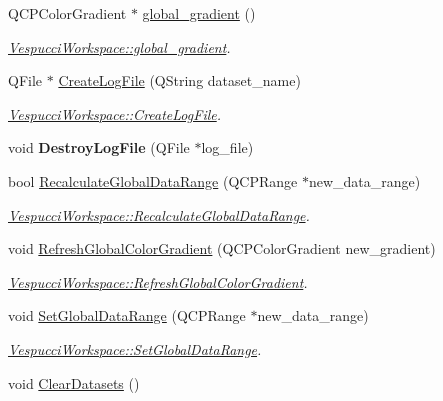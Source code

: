 \begin{DoxyCompactItemize}
Q\+C\+P\+Color\+Gradient $\ast$ \hyperlink{class_vespucci_workspace_a5f48f7a39986081e485eb23df00a5428}{global\+\_\+gradient} ()
\begin{DoxyCompactList}\small\item\em \hyperlink{class_vespucci_workspace_a5f48f7a39986081e485eb23df00a5428}{Vespucci\+Workspace\+::global\+\_\+gradient}. \end{DoxyCompactList}\item 
Q\+File $\ast$ \hyperlink{class_vespucci_workspace_a146009858a8dcd88e46a695ce9d5c965}{Create\+Log\+File} (Q\+String dataset\+\_\+name)
\begin{DoxyCompactList}\small\item\em \hyperlink{class_vespucci_workspace_a146009858a8dcd88e46a695ce9d5c965}{Vespucci\+Workspace\+::\+Create\+Log\+File}. \end{DoxyCompactList}\item 
\hypertarget{class_vespucci_workspace_a9b26bd75e754f0413760b68716033b74}{void {\bfseries Destroy\+Log\+File} (Q\+File $\ast$log\+\_\+file)}\label{class_vespucci_workspace_a9b26bd75e754f0413760b68716033b74}

\item 
bool \hyperlink{class_vespucci_workspace_a0aefd22de491420f2a172448dafc90fc}{Recalculate\+Global\+Data\+Range} (Q\+C\+P\+Range $\ast$new\+\_\+data\+\_\+range)
\begin{DoxyCompactList}\small\item\em \hyperlink{class_vespucci_workspace_a0aefd22de491420f2a172448dafc90fc}{Vespucci\+Workspace\+::\+Recalculate\+Global\+Data\+Range}. \end{DoxyCompactList}\item 
void \hyperlink{class_vespucci_workspace_a616ca3bc6a0eed206870a25e484eaccb}{Refresh\+Global\+Color\+Gradient} (Q\+C\+P\+Color\+Gradient new\+\_\+gradient)
\begin{DoxyCompactList}\small\item\em \hyperlink{class_vespucci_workspace_a616ca3bc6a0eed206870a25e484eaccb}{Vespucci\+Workspace\+::\+Refresh\+Global\+Color\+Gradient}. \end{DoxyCompactList}\item 
void \hyperlink{class_vespucci_workspace_a2f281b2b05af5a907405eb901ab26633}{Set\+Global\+Data\+Range} (Q\+C\+P\+Range $\ast$new\+\_\+data\+\_\+range)
\begin{DoxyCompactList}\small\item\em \hyperlink{class_vespucci_workspace_a2f281b2b05af5a907405eb901ab26633}{Vespucci\+Workspace\+::\+Set\+Global\+Data\+Range}. \end{DoxyCompactList}\item 
\hypertarget{class_vespucci_workspace_a85053e9aa9e55a70f0a54fed14b8316c}{void \hyperlink{class_vespucci_workspace_a85053e9aa9e55a70f0a54fed14b8316c}{Clear\+Datasets} ()}\label{class_vespucci_workspace_a85053e9aa9e55a70f0a54fed14b8316c}


\end{DoxyCompactItemize}
